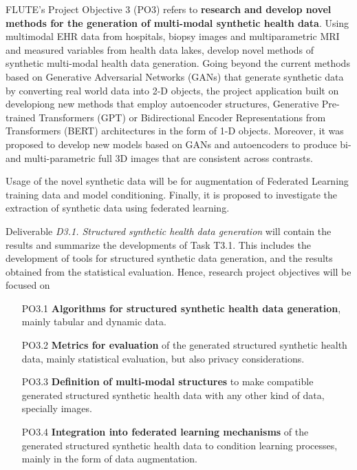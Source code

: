 \documentclass[a4paper,12pt]{article}
\begin{document}
FLUTE's Project Objective 3 (PO3) refers to \textbf{research and develop novel methods for the generation of multi-modal synthetic health data}. Using
multimodal EHR data from hospitals, biopsy images and multiparametric MRI and measured variables from health
data lakes, develop novel methods of synthetic multi-modal health data generation. Going beyond the current methods based on Generative Adversarial Networks (GANs) that generate synthetic data by converting real world data
into 2-D objects, the project application built on developiong new methods that employ autoencoder structures, Generative Pre-trained Transformers (GPT) or Bidirectional Encoder Representations from Transformers (BERT) architectures in the form of 1-D objects. Moreover, it was proposed to develop new models based on GANs and autoencoders to produce bi- and multi-parametric full 3D images that are consistent across contrasts. 

Usage of the novel synthetic data will be for augmentation of Federated Learning training data and model conditioning. Finally, it is proposed to investigate the extraction of synthetic data using federated learning.

Deliverable \emph{D3.1. Structured synthetic health data generation} will contain the results and summarize the developments of Task T3.1. This includes the development of tools for structured synthetic data
generation, and the results obtained from the statistical evaluation. Hence, research project objectives will be focused on
\begin{enumerate}
    \item[PO3.1] \textbf{Algorithms for structured synthetic health data generation}, mainly tabular and dynamic data.
    \item[PO3.2] \textbf{Metrics for evaluation} of the generated structured synthetic health data, mainly statistical evaluation, but also privacy considerations.
    \item[PO3.3] \textbf{Definition of multi-modal structures} to make compatible generated structured synthetic health data with any other kind of data, specially images.
    \item[PO3.4] \textbf{Integration into federated learning mechanisms} of the generated structured synthetic health data to condition learning processes, mainly in the form of data augmentation.
\end{enumerate}
\end{document}
